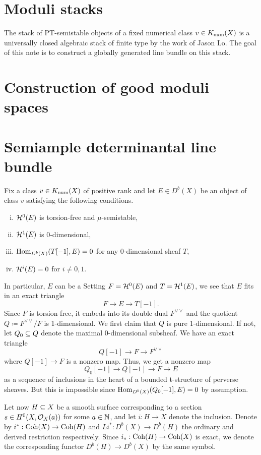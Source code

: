\documentclass[letterpaper,10pt]{article}
\theoremstyle{remark}
\begin{document}
\section{Moduli stacks}
The stack of PT-semistable objects of a fixed numerical class $v \in K_{\mathrm{num}}(X)$ is a universally closed algebraic stack of finite type by the work of Jason Lo. The goal of this note is to construct a globally generated line bundle on this stack.

\section{Construction of good moduli spaces}

\section{Semiample determinantal line bundle}
Fix a class $v \in K_{\mathrm{num}}(X)$ of positive rank and let $E \in D^b(X)$ be an object of class $v$ satisfying the following conditions.
\begin{enumerate}[(i)]
    \item $\mathcal{H}^0(E)$ is torsion-free and $\mu$-semistable,
    \item $\mathcal{H}^1(E)$ is 0-dimensional,
    \item $\mathrm{Hom}_{D^b(X)}(T[-1], E) = 0$ for any 0-dimensional sheaf $T$,
    \item $\mathcal{H}^i(E) = 0$ for $i \neq 0, 1$.
\end{enumerate}
In particular, $E$ can be a 
Setting $F = \mathcal{H}^0(E)$ and $T = \mathcal{H}^1(E)$, we see that $E$ fits in an exact triangle
\[ F \to E \to T[-1]. \]
Since $F$ is torsion-free, it embeds into its double dual $F^{\vee\vee}$ and the quotient $Q \coloneqq F^{\vee\vee}/F$ is 1-dimensional. We first claim that $Q$ is pure 1-dimensional. If not, let $Q_0 \subseteq Q$ denote the maximal 0-dimensional subsheaf. We have an exact triangle
\[ Q[-1] \to F \to F^{\vee\vee} \]
where $Q[-1] \to F$ is a nonzero map. Thus, we get a nonzero map
\[ Q_0[-1] \to Q[-1] \to F \to E \]
as a sequence of inclusions in the heart of a bounded t-structure of perverse sheaves. But this is impossible since $\mathrm{Hom}_{D^b(X)}(Q_0[-1], E) = 0$ by assumption.

Let now $H \subseteq X$ be a smooth surface corresponding to a section $s \in H^0(X, \mathcal{O}_X(a))$ for some $a \in \mathbb{N}$, and let $i: H \to X$ denote the inclusion. Denote by $i^*: \mathrm{Coh}(X) \to \mathrm{Coh}(H)$ and $Li^*: D^b(X) \to D^b(H)$ the ordinary and derived restriction respectively. Since $i_*: \mathrm{Coh}(H) \to \mathrm{Coh}(X)$ is exact, we denote the corresponding functor $D^b(H) \to D^b(X)$ by the same symbol.
\end{document}
